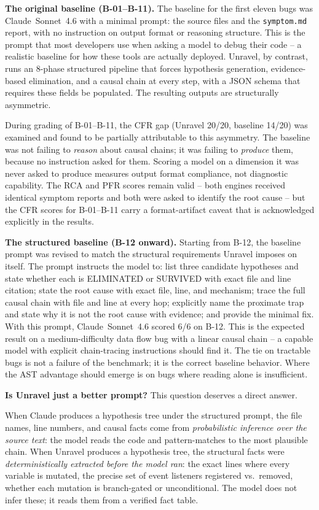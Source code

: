 \documentclass[12pt,a4paper]{article}
\newcommand{\code}[1]{\texttt{\small #1}}
\begin{document}
\textbf{The original baseline (B-01--B-11).} The baseline for the first eleven bugs was
Claude~Sonnet~4.6 with a minimal prompt: the source files and the \code{symptom.md}
report, with no instruction on output format or reasoning structure. This is the prompt
that most developers use when asking a model to debug their code -- a realistic baseline
for how these tools are actually deployed. Unravel, by contrast, runs an 8-phase
structured pipeline that forces hypothesis generation, evidence-based elimination, and a
causal chain at every step, with a JSON schema that requires these fields be populated.
The resulting outputs are structurally asymmetric.

During grading of B-01--B-11, the CFR gap (Unravel 20/20, baseline 14/20) was examined
and found to be partially attributable to this asymmetry. The baseline was not failing to
\textit{reason} about causal chains; it was failing to \textit{produce} them, because no
instruction asked for them. Scoring a model on a dimension it was never asked to produce
measures output format compliance, not diagnostic capability. The RCA and PFR scores
remain valid -- both engines received identical symptom reports and both were asked to
identify the root cause -- but the CFR scores for B-01--B-11 carry a format-artifact
caveat that is acknowledged explicitly in the results.

\textbf{The structured baseline (B-12 onward).} Starting from B-12, the baseline prompt
was revised to match the structural requirements Unravel imposes on itself. The prompt
instructs the model to: list three candidate hypotheses and state whether each is
ELIMINATED or SURVIVED with exact file and line citation; state the root cause with
exact file, line, and mechanism; trace the full causal chain with file and line at every
hop; explicitly name the proximate trap and state why it is not the root cause with
evidence; and provide the minimal fix. With this prompt, Claude~Sonnet~4.6 scored 6/6
on B-12. This is the expected result on a medium-difficulty data flow bug with a linear
causal chain -- a capable model with explicit chain-tracing instructions should find it.
The tie on tractable bugs is not a failure of the benchmark; it is the correct baseline
behavior. Where the AST advantage should emerge is on bugs where reading alone is
insufficient.

\textbf{Is Unravel just a better prompt?} This question deserves a direct answer.

When Claude produces a hypothesis tree under the structured prompt, the file names, line
numbers, and causal facts come from \textit{probabilistic inference over the source text}:
the model reads the code and pattern-matches to the most plausible chain. When Unravel
produces a hypothesis tree, the structural facts were \textit{deterministically extracted
before the model ran}: the exact lines where every variable is mutated, the precise set
of event listeners registered vs.\ removed, whether each mutation is branch-gated or
unconditional. The model does not infer these; it reads them from a verified fact table.
\end{document}
